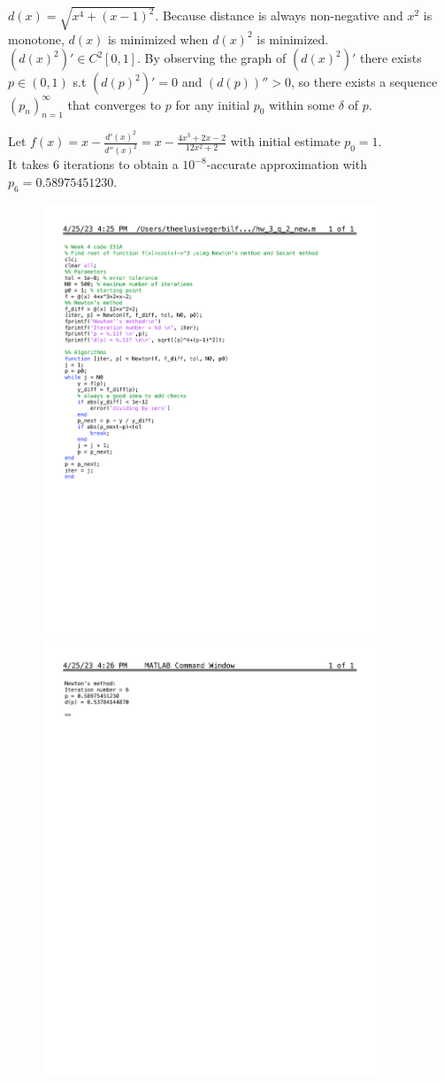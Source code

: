 \documentclass[12pt]{article}
\begin{document}
\begin{enumerate}[label=\bfseries Problem \arabic*:]
$d(x)=\sqrt{x^4+(x-1)^2}$. Because distance is always non-negative and $x^2$ is monotone, $d(x)$ is minimized when $d(x)^2$ is minimized.\\ 
$(d(x)^2)'\in C^2[0,1]$. By observing the graph of $(d(x)^2)'$ there exists $p\in(0,1)$ s.t $(d(p)^2)'=0$ and $(d(p))''>0$, so there exists a sequence $(p_n)^{\infty}_{n=1}$ that converges to $p$ for any initial $p_0$ within some $\delta$ of $p$.\par
Let $f(x)=x-\frac{d'(x)^2}{d''(x)^2}=x-\frac{4x^3+2x-2}{12x^2+2}$ with initial estimate $p_0=1$.\\
It takes $6$ iterations to obtain a $10^{-8}$-accurate approximation with $p_6=0.58975451230$.
\begin{figure}[H]
  \centering
      \includegraphics[trim=2cm 10cm 0 2cm, width=10cm]{hw_3_q_2_new.pdf}
      \includegraphics[trim=2cm 20cm 0 1cm, width=10cm]{Command_hw_3_q_2_new.pdf}

\end{figure}
\end{enumerate}
\end{document}
